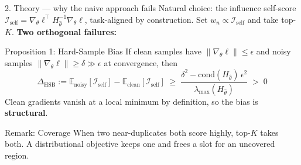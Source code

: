 \documentclass[aspectratio=169,11pt]{beamer}
\begin{document}
\begin{frame}{2. Theory --- why the naive approach fails}
  Natural choice: the influence self-score $\mathcal{I}_\text{self} = \nabla_\theta \ell^\top H_{\hat{\theta}}^{-1} \nabla_\theta \ell$, task-aligned by construction. Set $w_n \propto \mathcal{I}_\text{self}$ and take top-$K$. \textbf{Two orthogonal failures:}
  \smallskip
  \begin{block}{Proposition 1: Hard-Sample Bias }
    If clean samples have $\|\nabla_\theta \ell\| \leq \epsilon$ and noisy samples $\|\nabla_\theta \ell\| \geq \delta \gg \epsilon$ at convergence, then
    \[
      \Delta_\text{HSB} := \mathbb{E}_{\text{noisy}}[\mathcal{I}_\text{self}] - \mathbb{E}_{\text{clean}}[\mathcal{I}_\text{self}]
      \;\geq\; \frac{\delta^2 - \mathrm{cond}(H_{\hat{\theta}})\,\epsilon^2}{\lambda_{\max}(H_{\hat{\theta}})} \;>\; 0
    \]
    Clean gradients vanish at a local minimum by definition, so the bias is \textbf{structural}.
  \end{block}
  \begin{block}{Remark: Coverage }
    When two near-duplicates both score highly, top-$K$ takes both. A distributional objective keeps one and frees a slot for an uncovered region.
  \end{block}
\end{frame}
\end{document}

